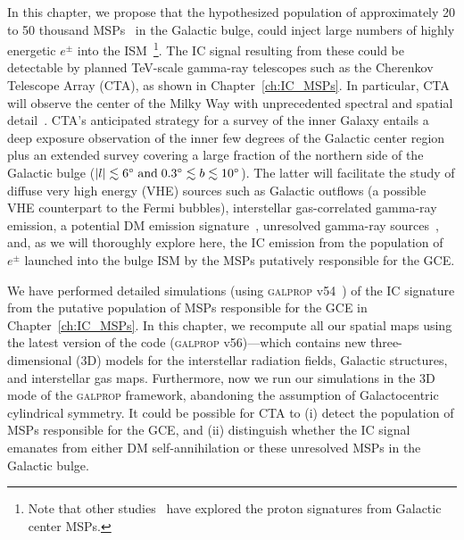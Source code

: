\documentclass[doublespace,nopageskip]{VTthesis}
\begin{document}
In this chapter, we propose that the hypothesized population of approximately 20 to 50 thousand MSPs~\citep{2020JCAP...12..035P} in the Galactic bulge, could inject large numbers of highly energetic $e^{\pm}$ into the ISM~\footnote{Note that other studies~\citep[e.g.,][]{2018JCAP...07..042G} have explored the proton signatures from Galactic center MSPs.}. The IC signal resulting from these could be detectable by planned TeV-scale gamma-ray telescopes such as 
the Cherenkov Telescope Array (CTA), as shown in Chapter~\ref{ch:IC_MSPs}. 
%
In particular, CTA will observe the center of the Milky Way with unprecedented spectral and spatial detail~\citep{2019scta.book.....C}. 
%
CTA's anticipated strategy for a survey of the inner Galaxy entails a deep exposure observation of the inner few degrees of the Galactic center region plus an extended survey covering a large fraction of the northern side of the Galactic bulge ($|l|\lesssim 6^{\circ}\;{\rm and}\; 0.3^{\circ}\lesssim b \lesssim 10^{\circ}$). The latter will facilitate the study of diffuse very high energy (VHE) sources such as Galactic outflows (a possible VHE counterpart to the Fermi bubbles), interstellar gas-correlated gamma-ray emission, a potential DM emission signature~\citep{2021JCAP...01..057A}, unresolved gamma-ray sources~\citep{2019ICRC...36..817V}, and, as we will thoroughly explore here, the IC emission from the 
population of $e^\pm$ launched into the bulge ISM by the
 MSPs putatively responsible for the GCE.  



We have performed detailed simulations (using \textsc{galprop} v54~\citealt{2006ApJ...648L..29P}) of the IC signature from the putative population of MSPs responsible for the GCE in Chapter~\ref{ch:IC_MSPs}. In this chapter, we recompute all our spatial maps using the latest version of the code (\textsc{galprop} v56)---which contains new three-dimensional (3D) models for the interstellar radiation fields, Galactic structures, and interstellar gas maps. Furthermore, now we run our simulations in the 3D mode of the \textsc{galprop} framework, abandoning the assumption of Galactocentric cylindrical symmetry. 
It could be possible for CTA to (i) detect the population of MSPs responsible for the GCE, and (ii) distinguish whether the IC signal emanates from either DM self-annihilation or these unresolved MSPs in the Galactic bulge. 
\end{document}
